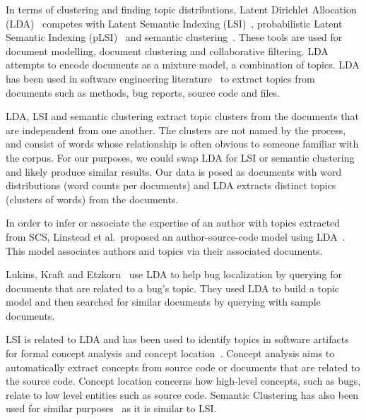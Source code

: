 \documentclass[times, 10pt,twocolumn]{article}
\newcommand{\shrinkit}{\vspace*{-.3em}}
\begin{document}

In terms of clustering and finding topic distributions, Latent
Dirichlet Allocation (LDA)~\cite{944937} competes with Latent Semantic
Indexing
(LSI)~\cite{1374321-short,10.1109/ICPC.2007.13-short},
probabilistic Latent Semantic Indexing (pLSI)~\cite{944937} and
semantic clustering~\cite{1698774-short,1566153-short}. These tools are used for
document modelling, document clustering and collaborative
filtering. LDA attempts to encode documents as a mixture
model, a combination of topics.  LDA has been used in software engineering
literature~\cite{lukins2008,10.1109/MSR.2007.20-short}%
to extract topics from documents such as methods, bug
reports, source code and files.

LDA, LSI and semantic clustering extract topic
clusters from the documents that are independent from one another. 
The clusters are not named by the process, and consist of
words whose
relationship is often obvious to someone familiar with the corpus. For our purposes, we
could swap LDA for LSI or semantic clustering and likely produce similar
results. Our data is posed as documents with word distributions (word
counts per documents) and LDA extracts distinct topics (clusters of
words) from the documents.

\shrinkit
{}
\shrinkit




In order to infer or associate the expertise of an author with topics
extracted from SCS, Linstead et al.\  proposed an author-source-code model
using LDA~\cite{10.1109/MSR.2007.20-short}.%
This model associates authors and topics via their associated documents.


Lukins, Kraft and Etzkorn~\cite{lukins2008} use LDA to help bug
localization by querying for documents that are related to a bug's
topic. They used LDA to build a topic model and then searched for
similar documents by querying with sample documents.

LSI is related to LDA and has been used to identify topics in software
artifacts for formal concept analysis and concept
location~\cite{1374321-short,10.1109/ICPC.2007.13-short}.
Concept analysis aims to automatically extract concepts from source
code or documents that are related to the source code.  Concept location concerns how
high-level concepts, such as bugs, relate to low level entities such as source code. 
Semantic Clustering has also been
used for similar purposes~\cite{1698774-short,1566153-short} as it is similar to
LSI.
\end{document}
